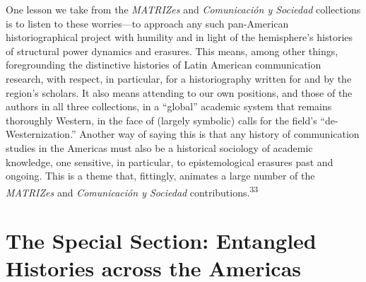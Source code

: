 \documentclass{tufte-handout}
\begin{document}
One lesson we take from the \emph{MATRIZes} and \emph{Comunicación y
Sociedad} collections is to listen to these worries---to approach any
such pan-American historiographical project with humility and in light
of the hemisphere's histories of structural power dynamics and erasures.
This means, among other things, foregrounding the distinctive histories
of  Latin American communication research, with respect, in particular,
for a historiography written for and by the region's scholars. It also
means attending to our own positions, and those of the authors in all
three collections, in a ``global'' academic system that remains
thoroughly Western, in the face of (largely symbolic) calls for the
field's ``de-Westernization.'' Another way of saying this is that any
history of communication studies in the Americas must also be a
historical sociology of academic knowledge, one sensitive, in
particular, to epistemological erasures past and ongoing. This is a
theme that, fittingly, animates a large number of the \emph{MATRIZes}
and \emph{Comunicación y Sociedad} contributions.\textsuperscript{33}

\hypertarget{the-special-section-entangled-histories-across-the-americas}{%
\section{The Special Section: Entangled Histories across the
Americas}\label{the-special-section-entangled-histories-across-the-americas}}
\end{document}
